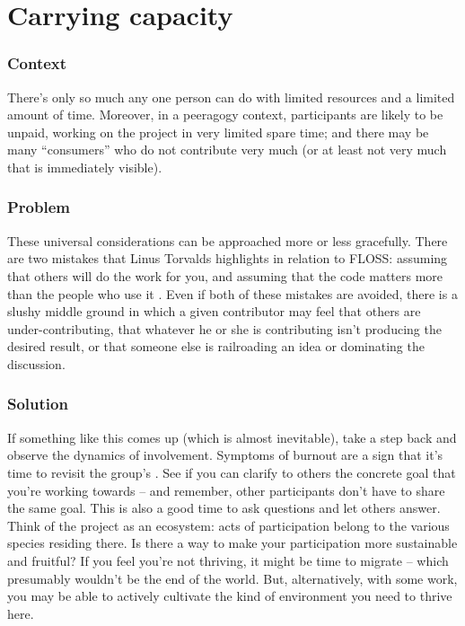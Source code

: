 \begingroup \color{OliveGreen}

\section{Carrying capacity}\label{sec:Carrying_capacity}
\subsubsection*{Context} There's only so much any one person can do with
limited resources and a limited amount of time.  Moreover, in a
peeragogy context, participants are likely to be unpaid, working on
the project in very limited spare time; and there may be many
``consumers'' who do not contribute very much (or at least not very much that is immediately visible).

\subsubsection*{Problem} These universal considerations can
be approached more or less gracefully.  There are two mistakes that
Linus Torvalds highlights in relation to FLOSS: assuming that others
will do the work for you, and assuming that the code matters more than
the people who use it \cite{torvalds-interview}.  Even if both of these mistakes are avoided,
there is a slushy middle ground in which a given contributor may feel
that others are under-contributing, that whatever he or she is
contributing isn't producing the desired result, or that someone else
is railroading an idea or dominating the discussion.

\subsubsection*{Solution} If something like this comes up (which is almost inevitable),
take a step back and observe the dynamics of involvement.  Symptoms of
burnout are a sign that it's time to revisit the group's
.  See if you can clarify to others the concrete
goal that you're working towards -- and remember, other participants
don't have to share the same goal.  This is also a good time to ask
questions and let others answer.  Think of the project as an
ecosystem: acts of participation belong to the various species
residing there.  Is there a way to make your participation more
sustainable and fruitful?  If you feel you're not thriving, it might
be time to migrate -- which presumably wouldn't be the end
of the world.  But, alternatively, with some work, you may be able to
actively cultivate the kind of environment you need to thrive here.

